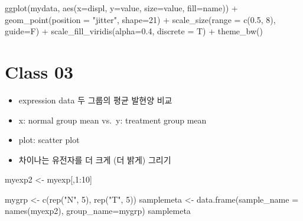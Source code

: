 \documentclass[
]{book}
\newenvironment{Shaded}{\begin{snugshade}}{\end{snugshade}}
\newcommand{\AttributeTok}[1]{\textcolor[rgb]{0.77,0.63,0.00}{#1}}
\newcommand{\DecValTok}[1]{\textcolor[rgb]{0.00,0.00,0.81}{#1}}
\newcommand{\FloatTok}[1]{\textcolor[rgb]{0.00,0.00,0.81}{#1}}
\newcommand{\FunctionTok}[1]{\textcolor[rgb]{0.00,0.00,0.00}{#1}}
\newcommand{\NormalTok}[1]{#1}
\newcommand{\OtherTok}[1]{\textcolor[rgb]{0.56,0.35,0.01}{#1}}
\newcommand{\SpecialCharTok}[1]{\textcolor[rgb]{0.00,0.00,0.00}{#1}}
\newcommand{\StringTok}[1]{\textcolor[rgb]{0.31,0.60,0.02}{#1}}
\providecommand{\tightlist}{%
  \setlength{\itemsep}{0pt}\setlength{\parskip}{0pt}}
\begin{document}
\begin{Shaded}
\begin{Highlighting}[]
\FunctionTok{ggplot}\NormalTok{(mydata, }\FunctionTok{aes}\NormalTok{(}\AttributeTok{x=}\NormalTok{displ, }\AttributeTok{y=}\NormalTok{value, }\AttributeTok{size=}\NormalTok{value, }\AttributeTok{fill=}\NormalTok{name)) }\SpecialCharTok{+}
  \FunctionTok{geom\_point}\NormalTok{(}\AttributeTok{position =} \StringTok{"jitter"}\NormalTok{, }\AttributeTok{shape=}\DecValTok{21}\NormalTok{) }\SpecialCharTok{+}
  \FunctionTok{scale\_size}\NormalTok{(}\AttributeTok{range =} \FunctionTok{c}\NormalTok{(}\FloatTok{0.5}\NormalTok{, }\DecValTok{8}\NormalTok{), }\AttributeTok{guide=}\NormalTok{F) }\SpecialCharTok{+}
  \FunctionTok{scale\_fill\_viridis}\NormalTok{(}\AttributeTok{alpha=}\FloatTok{0.4}\NormalTok{, }\AttributeTok{discrete =}\NormalTok{ T) }\SpecialCharTok{+}
  \FunctionTok{theme\_bw}\NormalTok{()}
\end{Highlighting}
\end{Shaded}

\hypertarget{class-03-1}{%
\section{Class 03}\label{class-03-1}}

\begin{itemize}
\tightlist
\item
  expression data 두 그룹의 평균 발현양 비교
\item
  x: normal group mean vs.~y: treatment group mean
\item
  plot: scatter plot
\item
  차이나는 유전자를 더 크게 (더 밝게) 그리기
\end{itemize}

\begin{Shaded}
\begin{Highlighting}[]

\NormalTok{myexp2 }\OtherTok{\textless{}{-}}\NormalTok{ myexp[,}\DecValTok{1}\SpecialCharTok{:}\DecValTok{10}\NormalTok{]}

\NormalTok{mygrp }\OtherTok{\textless{}{-}} \FunctionTok{c}\NormalTok{(}\FunctionTok{rep}\NormalTok{(}\StringTok{"N"}\NormalTok{, }\DecValTok{5}\NormalTok{), }\FunctionTok{rep}\NormalTok{(}\StringTok{"T"}\NormalTok{, }\DecValTok{5}\NormalTok{))}
\NormalTok{samplemeta }\OtherTok{\textless{}{-}} \FunctionTok{data.frame}\NormalTok{(}\AttributeTok{sample\_name =} \FunctionTok{names}\NormalTok{(myexp2), }\AttributeTok{group\_name=}\NormalTok{mygrp)}
\NormalTok{samplemeta}
\end{Highlighting}
\end{Shaded}
\end{document}
